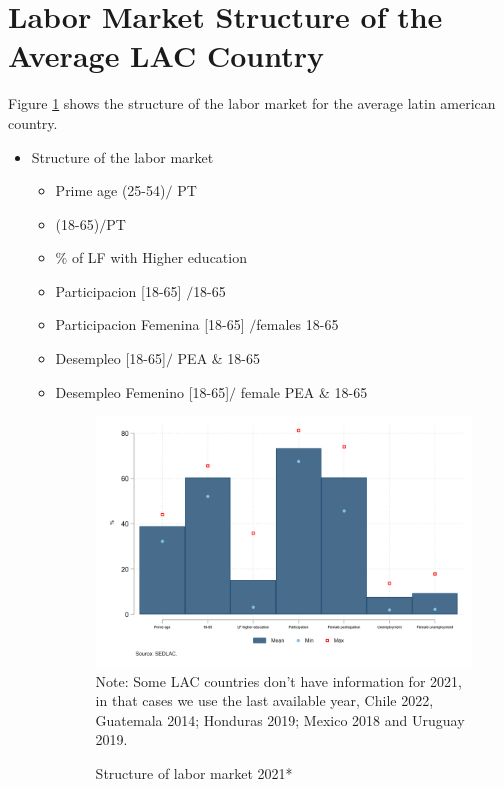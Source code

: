 \documentclass[english]{article}
\begin{document}
\section{Labor Market Structure of the Average LAC Country}
Figure \ref{fig:lab_mkt_str} shows the structure of the labor market for the average latin american country. 
\begin{itemize}
    \item Structure of the labor market 
    \begin{itemize}
        \item Prime age (25-54)$/$ PT
        \item (18-65)$/$PT
        \item \% of LF with Higher education
        \item Participacion [18-65] $/$18-65
        \item Participacion Femenina [18-65] $/$females 18-65
        \item Desempleo [18-65]$/$ PEA \& 18-65
        \item Desempleo Femenino [18-65]$/$ female PEA \& 18-65
        \begin{figure}[!htb]
        \centering
        \caption{Structure of labor market 2021*}     
        \includegraphics[scale=.3]{latex/figures/Snapshot/Structure of labor market.png}
        \label{fig:lab_mkt_str}
        \footnotesize{Note: Some LAC countries don’t have information for 2021, in that cases we use the last available year, Chile 2022, Guatemala 2014; Honduras 2019; Mexico 2018 and Uruguay 2019.}
        \end{figure}
        

\end{itemize}
\end{itemize}
\end{document}
